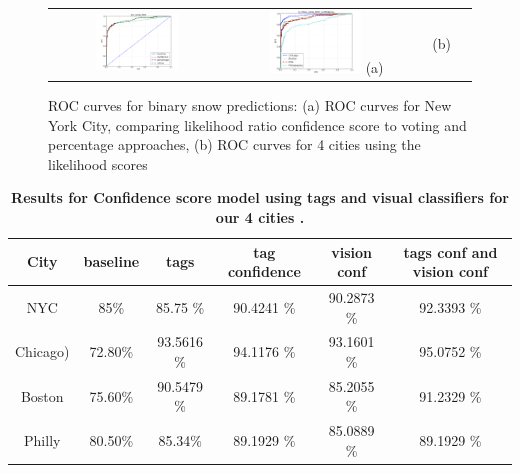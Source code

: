 \documentclass[10pt,journal,compsoc]{IEEEtran}
\begin{document}
\begin{figure}
\hspace{-0.25in}
\small{
\begin{tabular}{@{}c@{}c@{}c@{}c@{}}
\includegraphics[width=0.50\textwidth,clip,trim=0.4in 0 0.8in 0]{plots/nyc_snow_ROC.png} &
\includegraphics[width=0.50\textwidth,clip,trim=0.4in 0 0.8in 0]{plots/city_cmp_snow_ROC.png} 
(a) & (b)  
\end{tabular}
}
\vspace{-6pt}
\caption{ROC curves for binary snow predictions: (a) ROC curves for New York City, comparing likelihood
ratio confidence score to voting and percentage approaches, (b) ROC curves for 4 cities using the likelihood
scores}
\label{fig:city_roc}
\vspace{-6pt}
\end{figure}








\begin{table} 
 \caption {\textbf{Results for Confidence score model using tags and visual classifiers for our 4 cities .}}
\label{tab:city_conf_tag_vision} 
\begin{center}
{
\begin{tabular} {|c|c|c|c|c|c|} 
\hline 
City &  baseline & tags  &  tag confidence  &  vision conf & tags conf and vision conf \tabularnewline
\hline 

{NYC} & 85\% & 85.75 \% &90.4241 \%&90.2873 \% &92.3393 \%\tabularnewline
\hline 
{Chicago)} &72.80\% & 93.5616 \% &94.1176 \% &93.1601 \% &95.0752 \%  \tabularnewline
\hline 
{Boston} & 75.60\%& 90.5479 \% &89.1781 \%&85.2055 \% & 91.2329 \% \tabularnewline
\hline 
{Philly} & 80.50\% & 85.34\% & 89.1929 \% &85.0889 \%	 & 89.1929 \%  \tabularnewline
\hline 

\end{tabular}}
\end{center}
\vspace{-12pt}
\end{table}
\end{document}
